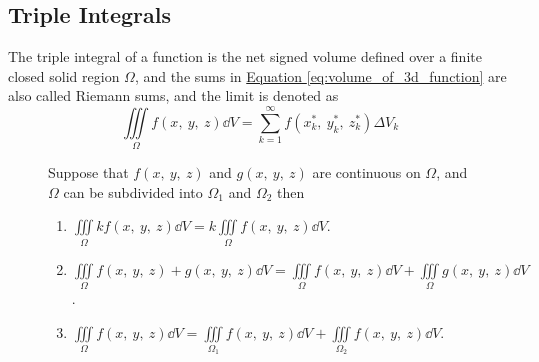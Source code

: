 \documentclass{article}
\begin{document}
\subsection{Triple Integrals}
\begin{definition}
    The triple integral of a function is the net signed volume
    defined over a finite closed solid region $\Omega$, and the sums in
    \hyperref[eq:volume_of_3d_function]{Equation \ref{eq:volume_of_3d_function}}
    are also called Riemann sums, and the limit is denoted as
    \begin{equation*}
        \iiint\limits_{\Omega} f(x,\: y,\: z)  \dd{V}
        = \sum_{k=1}^{\infty} f(x_k^\ast,\: y_k^\ast,\: z_k^\ast) \Delta V_k
    \end{equation*}
\end{definition}
\begin{figure}[H]
	\begin{mdframed}[style=exampledefault,frametitle={Properties of Triple Integrals}]
		\begin{theorem}
            Suppose that $f(x,\: y,\: z) $ and $g(x,\: y,\: z)$ are continuous on $\Omega$,
            and $\Omega$ can be subdivided into $\Omega_1$ and $\Omega_2$ then
			\begin{enumerate}[label=\normalfont\alph*)]
				\item $\displaystyle\iiint\limits_\Omega kf(x,\: y,\: z) \dd{V}
                    = k\iiint\limits_\Omega f(x,\: y,\: z) \dd{V}$.
				\item $\displaystyle\iiint\limits_\Omega f(x,\: y,\: z) + g(x,\: y,\: z) \dd{V}
                    = \iiint\limits_\Omega f(x,\: y,\: z) \dd{V} + \iiint\limits_\Omega g(x,\: y,\: z) \dd{V}$.
                \item $\displaystyle\iiint\limits_\Omega f(x,\: y,\: z) \dd{V}
                    = \iiint\limits_{\Omega_1} f(x,\: y,\: z) \dd{V} + \iiint\limits_{\Omega_2} f(x,\: y,\: z) \dd{V}$.
			\end{enumerate}
		\end{theorem}
	\end{mdframed}
\end{figure}
\newpage
\end{document}
